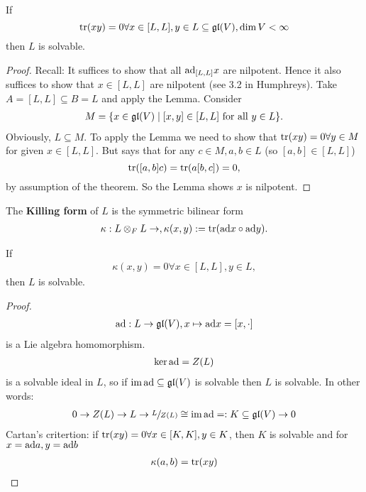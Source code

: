\begin{theorem}
    If $$\operatorname{tr} (xy) = 0 \forall x \in [L,L], y \in L \subseteq \mathfrak{gl}(V), \dim V < \infty$$
    then $L$ is solvable.
\end{theorem}
\begin{proof}
    Recall: It suffices to show that all $\text{ad}_{[L,L]} x$ are nilpotent.
    Hence it also suffices to show that $x \in [L,L]$ are nilpotent (see 3.2 in Humphreys).
    Take $A = [L,L] \subseteq B = L$ and apply the Lemma.
    Consider
    \begin{align*}
        M = \{x \in \mathfrak{gl}(V) \mid [x,y] \in [L,L] \text{ for all } y \in L\}.
    \end{align*}
    Obviously, $L \subseteq M$. To apply the Lemma we need to show that $ \operatorname{tr} (xy) = 0 \forall y \in M$ for given $x \in [L,L]$.
    But  says that for any $c \in M, a,b \in L$ (so $[a,b] \in [L,L]$) 
    $$ \operatorname{tr}([a,b]c) = \operatorname{tr}(a[b,c]) = 0,$$
    by assumption of the theorem.
    So the Lemma shows $x$ is nilpotent.
\end{proof}

\begin{definition}
    The \textbf{Killing form} of $L$ is the symmetric bilinear form
    \begin{align*}
        \kappa: L \otimes_F L \to , \kappa(x,y) := \operatorname{tr}(\text{ad} x \circ \text{ad} y).
    \end{align*}
\end{definition}

\begin{corollary}
    If 
    \begin{align*}
        \kappa(x,y) = 0 \forall x \in [L,L], y \in L,
    \end{align*}
    then $L$ is solvable.
\end{corollary}
\begin{proof}
    \begin{align*}
        \text{ad}: L \to \mathfrak{gl}(V), x \mapsto \text{ad} x = [x, \cdot]
    \end{align*}
    is a Lie algebra homomorphism.
    \begin{align*}
        \ker \text{ad} = Z(L)
    \end{align*}
    is a solvable ideal in $L$, so if $\operatorname{im} \text{ad} \subseteq \mathfrak{gl}(V)$ is solvable then $L$ is solvable.
    In other words:
    \begin{align*}
        0 \to Z(L) \to L \to \sfrac{L}{Z(L)} \cong \operatorname{im} \text{ad} = : K \subseteq \mathfrak{gl}(V) \to 0
    \end{align*}
    Cartan's critertion: if $\operatorname{tr} (xy) = 0 \forall x \in [K,K], y \in K$, then $K$ is solvable and
    for $x = \text{ad} a, y = \text{ad} b$
    \begin{align*}
        \kappa(a,b) = \operatorname{tr} (xy)
    \end{align*}
\end{proof}

